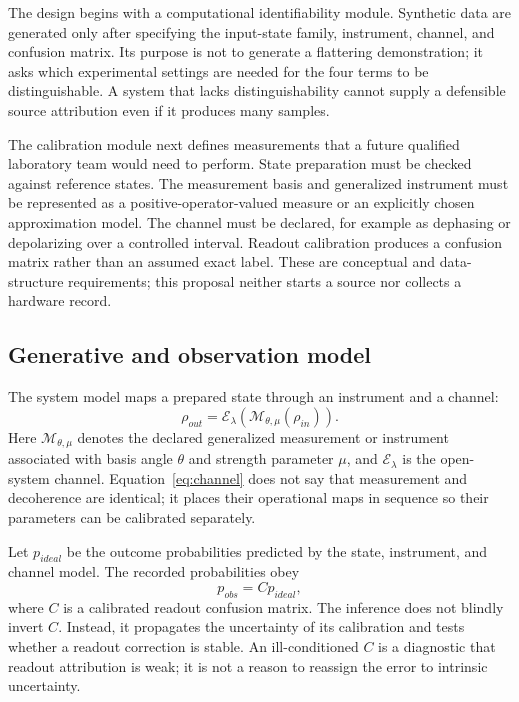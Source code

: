 \documentclass[conference]{../../../../Conference-LaTeX-template_10-17-19/IEEEtran}
\begin{document}
The design begins with a computational identifiability module. Synthetic data are generated only after specifying the input-state family, instrument, channel, and confusion matrix. Its purpose is not to generate a flattering demonstration; it asks which experimental settings are needed for the four terms to be distinguishable. A system that lacks distinguishability cannot supply a defensible source attribution even if it produces many samples.

The calibration module next defines measurements that a future qualified laboratory team would need to perform. State preparation must be checked against reference states. The measurement basis and generalized instrument must be represented as a positive-operator-valued measure or an explicitly chosen approximation model. The channel must be declared, for example as dephasing or depolarizing over a controlled interval. Readout calibration produces a confusion matrix rather than an assumed exact label. These are conceptual and data-structure requirements; this proposal neither starts a source nor collects a hardware record.

\subsection{Generative and observation model}

The system model maps a prepared state through an instrument and a channel:
\begin{equation}
\rho_{out}=\mathcal{E}_{\lambda}\!\left(\mathcal{M}_{\theta,\mu}(\rho_{in})\right).
\label{eq:channel}
\end{equation}
Here $\mathcal{M}_{\theta,\mu}$ denotes the declared generalized measurement or instrument associated with basis angle $\theta$ and strength parameter $\mu$, and $\mathcal{E}_{\lambda}$ is the open-system channel. Equation~\eqref{eq:channel} does not say that measurement and decoherence are identical; it places their operational maps in sequence so their parameters can be calibrated separately.

Let $p_{ideal}$ be the outcome probabilities predicted by the state, instrument, and channel model. The recorded probabilities obey
\begin{equation}
p_{obs}=C p_{ideal},
\label{eq:readout}
\end{equation}
where $C$ is a calibrated readout confusion matrix. The inference does not blindly invert $C$. Instead, it propagates the uncertainty of its calibration and tests whether a readout correction is stable. An ill-conditioned $C$ is a diagnostic that readout attribution is weak; it is not a reason to reassign the error to intrinsic uncertainty.
\end{document}
